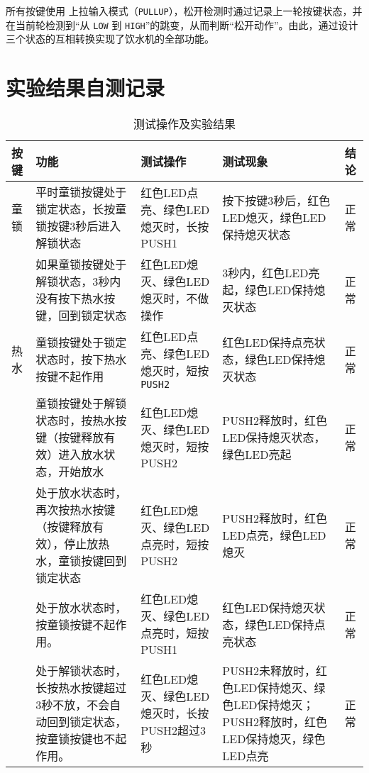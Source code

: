 \documentclass{article}
\newcommand{\code}[1]{\lstinline[basicstyle=\ttfamily,keywordstyle=\color{blue}]|#1|}
\begin{document}
所有按键使用 上拉输入模式（\code{PULLUP}），松开检测时通过记录上一轮按键状态，并在当前轮检测到“从 \code{LOW} 到 \code{HIGH}”的跳变，从而判断“松开动作”。由此，通过设计三个状态的互相转换实现了饮水机的全部功能。


\section{实验结果自测记录}
\begin{table}[H]
\centering
    \begin{tabular}{lp{4cm}p{4.5cm}p{5cm}l}
            \toprule[1.5pt]
            \textbf{按键} & \textbf{功能} & \textbf{测试操作} & \textbf{测试现象} & \textbf{结论} \\
            \midrule[1pt]
            童锁 & 平时童锁按键处于锁定状态，长按童锁按键3秒后进入解锁状态 & 红色LED点亮、绿色LED熄灭时，长按PUSH1 & 按下按键3秒后，红色LED熄灭，绿色LED保持熄灭状态 & 正常 \\
            \cline{2-5}
            ~ & 如果童锁按键处于解锁状态，3秒内没有按下热水按键，回到锁定状态 & 红色LED熄灭、绿色LED熄灭时，不做操作 & 3秒内，红色LED亮起，绿色LED保持熄灭状态 & 正常 \\
            \midrule[1pt]
            热水 & 童锁按键处于锁定状态时，按下热水按键不起作用 & 	红色LED点亮、绿色LED熄灭时，短按\code{PUSH2} & 红色LED保持点亮状态，绿色LED保持熄灭状态 & 正常 \\
            \cline{2-5}
             & 童锁按键处于解锁状态时，按热水按键（按键释放有效）进入放水状态，开始放水	 & 红色LED熄灭、绿色LED熄灭时，短按PUSH2 & PUSH2释放时，红色LED保持熄灭状态，绿色LED亮起 & 正常 \\
            \cline{2-5}
             & 处于放水状态时，再次按热水按键（按键释放有效），停止放热水，童锁按键回到锁定状态	 & 	红色LED熄灭、绿色LED点亮时，短按PUSH2 & 	PUSH2释放时，红色LED点亮，绿色LED熄灭 & 正常 \\
            \cline{2-5}
             & 处于放水状态时，按童锁按键不起作用。 & 红色LED熄灭、绿色LED点亮时，短按PUSH1 & 红色LED保持熄灭状态，绿色LED保持点亮状态 & 正常 \\
            \cline{2-5}
             & 处于解锁状态时，长按热水按键超过3秒不放，不会自动回到锁定状态，按童锁按键也不起作用。 & 红色LED熄灭、绿色LED熄灭时，长按PUSH2超过3秒 & PUSH2未释放时，红色LED保持熄灭、绿色LED保持熄灭；PUSH2释放时，红色LED保持熄灭，绿色LED点亮 & 正常 \\
            \bottomrule[1.5pt]
    \end{tabular}
    \caption{测试操作及实验结果}
\end{table}
\end{document}
